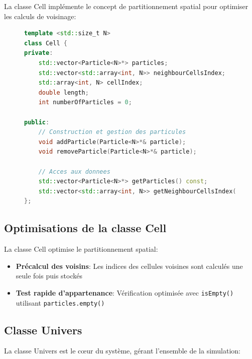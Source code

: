 \documentclass[12pt,a4paper]{article}
\begin{document}
La classe Cell implémente le concept de partitionnement spatial pour optimiser les calculs de voisinage:

\begin{figure}[H]
\begin{lstlisting}[language=C++, caption=Extrait de la classe Cell]
template <std::size_t N>
class Cell {
private:
    std::vector<Particle<N>*> particles;
    std::vector<std::array<int, N>> neighbourCellsIndex;
    std::array<int, N> cellIndex;
    double length;
    int numberOfParticles = 0;

public:
    // Construction et gestion des particules
    void addParticle(Particle<N>*& particle);
    void removeParticle(Particle<N>*& particle);
    
    // Acces aux donnees
    std::vector<Particle<N>*> getParticles() const;
    std::vector<std::array<int, N>> getNeighbourCellsIndex() const;
};
\end{lstlisting}
\end{figure}

\subsection{Optimisations de la classe Cell}

La classe Cell optimise le partitionnement spatial:

\begin{itemize}
    \item \textbf{Précalcul des voisins}: Les indices des cellules voisines sont calculés une seule fois puis stockés
    \item \textbf{Test rapide d'appartenance}: Vérification optimisée avec \texttt{isEmpty()} utilisant \texttt{particles.empty()}
\end{itemize}

\subsection{Classe Univers}

La classe Univers est le cœur du système, gérant l'ensemble de la simulation:
\end{document}
